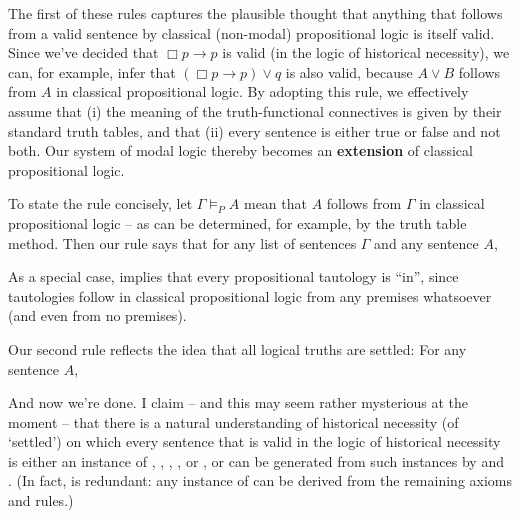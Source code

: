 The first of these rules captures the plausible thought that anything that
follows from a valid sentence by classical (non-modal) propositional logic is
itself valid. Since we've decided that $\Box p \to p$ is valid (in the logic of
historical necessity), we can, for example, infer that $(\Box p \to p) \lor q$
is also valid, because $A \lor B$ follows from $A$ in classical propositional
logic. By adopting this rule, we effectively assume that (i) the meaning of the
truth-functional connectives is given by their standard truth tables, and that
(ii) every sentence is either true or false and not both. Our system of modal
logic thereby becomes an \textbf{extension} of classical propositional
logic. \label{claim:extension}

To state the rule concisely, let $\Gamma \models_{P} A$ mean that $A$ follows
from $\Gamma$ in classical propositional logic -- as can be determined, for
example, by the truth table method. Then our rule says that for any list of
sentences $\Gamma$ and any sentence $A$,
%
\begin{principles}
\end{principles}

As a special case,  implies that every propositional tautology is
``in'', since tautologies follow in classical propositional logic from any
premises whatsoever (and even from no premises).

Our second rule reflects the idea that all logical truths are settled: For any
sentence $A$,
%
\begin{principles}
\end{principles}


And now we're done. I claim -- and this may seem rather mysterious at the moment
-- that there is a natural understanding of historical necessity (of `settled')
on which every sentence that is valid in the logic of historical necessity is
either an instance of , , , , or , or can be
generated from such instances by  and . (In fact,  is
redundant: any instance of  can be derived from the remaining axioms and
rules.)

